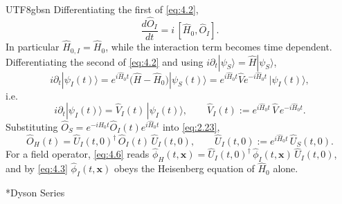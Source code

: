 \documentclass[11pt,a4paper,oneside]{report}
\makeatletter
\newcommand\topic{\@startsection{paragraph}{4}{\z@}{-1.7ex plus -.3ex}{.5ex}{\normalfont\normalsize\bfseries\itshape\boldmath}*}
\makeatother
\begin{document}
\begin{CJK*}{UTF8}{gbsn}
Differentiating the first of \eqref{eq:4.2},
\begin{equation*}
\frac{d\hat O_I}{dt}=i\,[\hat H_0,\hat O_I].
\tag{4.3}\label{eq:4.3}
\end{equation*}
In particular $\hat H_{0,I}=\hat H_0$, while the interaction term becomes time dependent. Differentiating the second of \eqref{eq:4.2} and using $i\partial_t|\psi_S\rangle=\hat H|\psi_S\rangle$,
\begin{equation*}
i\partial_t|\psi_I(t)\rangle
=e^{i\hat H_0t}\bigl(\hat H-\hat H_0\bigr)|\psi_S(t)\rangle
=e^{i\hat H_0t}\hat Ve^{-i\hat H_0t}\,|\psi_I(t)\rangle,
\tag{4.4}\label{eq:4.4}
\end{equation*}
i.e.
\begin{equation*}
{\displaystyle 
i\partial_t|\psi_I(t)\rangle=\hat V_I(t)\,|\psi_I(t)\rangle,
\qquad
\hat V_I(t):=e^{i\hat H_0t}\,\hat V\,e^{-i\hat H_0t}.
}
\tag{4.5}\label{eq:4.5}
\end{equation*}
Substituting $\hat O_S=e^{-i\hat H_0t}\hat O_I(t)e^{i\hat H_0t}$ into \eqref{eq:2.23},
\begin{equation*}
\hat O_H(t)=\hat U_I(t,0)^\dagger\,\hat O_I(t)\,\hat U_I(t,0),
\qquad
\hat U_I(t,0):=e^{i\hat H_0t}\,\hat U_S(t,0).
\tag{4.6}\label{eq:4.6}
\end{equation*}
For a field operator, \eqref{eq:4.6} reads $\hat\phi_H(t,\mathbf x)=\hat U_I(t,0)^\dagger\,\hat\phi_I(t,\mathbf x)\,\hat U_I(t,0)$, and by \eqref{eq:4.3} $\hat\phi_I(t,\mathbf x)$ obeys the Heisenberg equation of $\hat H_0$ alone.

\topic{Dyson Series}


\end{CJK*}
\end{document}
